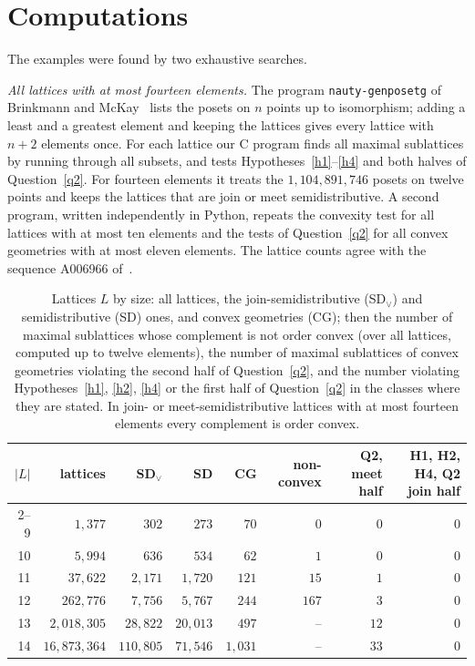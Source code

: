 \documentclass[11pt]{amsart}
\theoremstyle{definition}
\theoremstyle{remark}
\numberwithin{equation}{section}
\begin{document}
\section{Computations}\label{sec:search}

The examples were found by two exhaustive searches.

\emph{All lattices with at most fourteen elements.} The program \texttt{nauty-genposetg} of Brinkmann and McKay~\cite{BM,MP} lists the posets on $n$ points up to isomorphism; adding a least and a greatest element and keeping the lattices gives every lattice with $n+2$ elements once. For each lattice our C program finds all maximal sublattices by running through all subsets, and tests Hypotheses~\ref{h1}--\ref{h4} and both halves of Question~\ref{q2}. For fourteen elements it treats the $1{,}104{,}891{,}746$ posets on twelve points and keeps the lattices that are join or meet semidistributive. A second program, written independently in Python, repeats the convexity test for all lattices with at most ten elements and the tests of Question~\ref{q2} for all convex geometries with at most eleven elements. The lattice counts agree with the sequence A006966 of~\cite{OEIS}.

\begin{table}[ht]
\centering
\small
\begin{tabular}{rrrrrrrr}
\toprule
$|L|$ & lattices & SD$_\vee$ & SD & CG & non-convex & Q2, meet half & H1, H2, H4, Q2 join half \\
\midrule
2--9 & $1{,}377$ & $302$ & $273$ & $70$ & $0$ & $0$ & $0$\\
10 & $5{,}994$ & $636$ & $534$ & $62$ & $1$ & $0$ & $0$\\
11 & $37{,}622$ & $2{,}171$ & $1{,}720$ & $121$ & $15$ & $1$ & $0$\\
12 & $262{,}776$ & $7{,}756$ & $5{,}767$ & $244$ & $167$ & $3$ & $0$\\
13 & $2{,}018{,}305$ & $28{,}822$ & $20{,}013$ & $497$ & -- & $12$ & $0$\\
14 & $16{,}873{,}364$ & $110{,}805$ & $71{,}546$ & $1{,}031$ & -- & $33$ & $0$\\
\bottomrule
\end{tabular}
\caption{Lattices $L$ by size: all lattices, the join-semidistributive (SD$_\vee$) and semidistributive (SD) ones, and convex geometries (CG); then the number of maximal sublattices whose complement is not order convex (over all lattices, computed up to twelve elements), the number of maximal sublattices of convex geometries violating the second half of Question~\ref{q2}, and the number violating Hypotheses~\ref{h1}, \ref{h2}, \ref{h4} or the first half of Question~\ref{q2} in the classes where they are stated. In join- or meet-semidistributive lattices with at most fourteen elements every complement is order convex.}\label{tab:counts}
\end{table}
\end{document}
